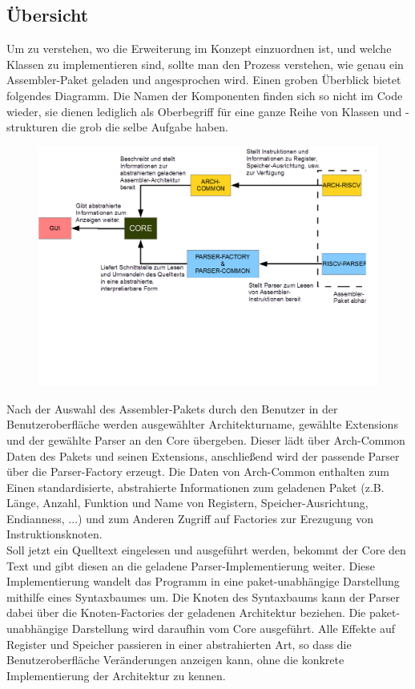 \subsection{Übersicht}
Um zu verstehen, wo die Erweiterung im Konzept einzuordnen ist, und welche Klassen zu implementieren sind, sollte man den Prozess verstehen, wie genau ein Assembler-Paket geladen und angesprochen wird. Einen groben Überblick bietet folgendes Diagramm. Die Namen der Komponenten finden sich so nicht im Code wieder, sie dienen lediglich als Oberbegriff für eine ganze Reihe von Klassen und -strukturen die grob die selbe Aufgabe haben.
\begin{figure}
	\centering
	\includegraphics[scale=0.5]{charts/extension-overview.png}
	\label{dev-manual-extension-overview}
\end{figure}
Nach der Auswahl des Assembler-Pakets durch den Benutzer in der Benutzeroberfläche werden ausgewählter Architekturname, gewählte Extensions und der gewählte Parser an den Core übergeben. Dieser lädt über Arch-Common Daten des Pakets und seinen Extensions, anschließend wird der passende Parser über die Parser-Factory erzeugt. Die Daten von Arch-Common enthalten zum Einen standardisierte, abstrahierte Informationen zum geladenen Paket (z.B. Länge, Anzahl, Funktion und Name von Registern, Speicher-Ausrichtung, Endianness, ...) und zum Anderen Zugriff auf Factories zur Erezugung von Instruktionsknoten.\\
Soll jetzt ein Quelltext eingelesen und ausgeführt werden, bekommt der Core den Text und gibt diesen an die geladene Parser-Implementierung weiter. Diese Implementierung wandelt das Programm in eine paket-unabhängige Darstellung mithilfe eines Syntaxbaumes um. Die Knoten des Syntaxbaums kann der Parser dabei über die Knoten-Factories der geladenen Architektur beziehen. Die paket-unabhängige Darstellung wird daraufhin vom Core ausgeführt. Alle Effekte auf Register und Speicher passieren in einer abstrahierten Art, so dass die Benutzeroberfläche Veränderungen anzeigen kann, ohne die konkrete Implementierung der Architektur zu kennen.\\

